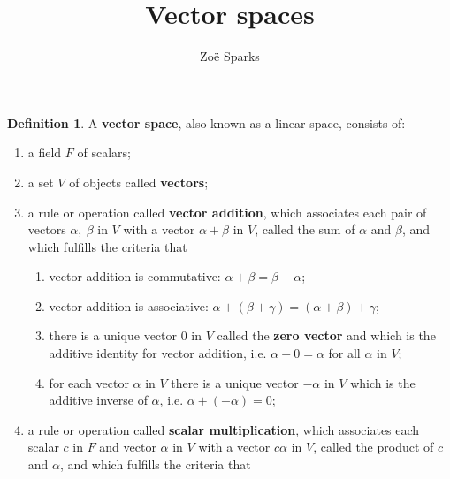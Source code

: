 \documentclass[12pt]{article}
\title{Vector spaces}
\author{Zoë Sparks}
\begin{document}
\theoremstyle{definition}

\newtheorem{thm}{Theorem}
\newtheorem*{nthm}{Theorem}
\newtheorem{sthm}{}[thm]
\newtheorem{lemma}{Lemma}[thm]
\newtheorem*{nlemma}{Lemma}
\newtheorem{cor}{Corollary}[thm]
\newtheorem*{prop}{Property}
\newtheorem*{defn}{Definition}
\newtheorem*{comm}{Comment}
\newtheorem*{exm}{Example}

\maketitle

\begin{defn}
  A \textbf{vector space}, also known as a linear space, consists
  of:
  \begin{enumerate}
    \item
      a field $F$ of scalars;
    \item
      a set $V$ of objects called \textbf{vectors};
    \item
      a rule or operation called \textbf{vector addition},
      which associates each pair of vectors $\alpha,\ \beta$ in
      $V$ with a vector $\alpha + \beta$ in $V$, called the sum
      of $\alpha$ and $\beta$, and which fulfills the criteria
      that
      \begin{enumerate}
        \item
          vector addition is commutative: $\alpha + \beta = \beta
          + \alpha$;
        \item
          vector addition is associative: $\alpha + (\beta +
          \gamma) = (\alpha + \beta) + \gamma$;
        \item
          there is a unique vector $0$ in $V$ called the
          \textbf{zero vector} and which is the additive identity
          for vector addition, i.e. $\alpha + 0 = \alpha$ for all
          $\alpha$ in $V$;
        \item
          for each vector $\alpha$ in $V$ there is a unique
          vector $-\alpha$ in $V$ which is the additive inverse
          of $\alpha$, i.e. $\alpha + (-\alpha) = 0$;
      \end{enumerate}
    \item
      a rule or operation called \textbf{scalar multiplication},
      which associates each scalar $c$ in $F$ and vector $\alpha$
      in $V$ with a vector $c\alpha$ in $V$, called the product
      of $c$ and $\alpha$, and which fulfills the criteria that
      \begin{enumerate}

\end{enumerate}
\end{enumerate}
\end{defn}
\end{document}
